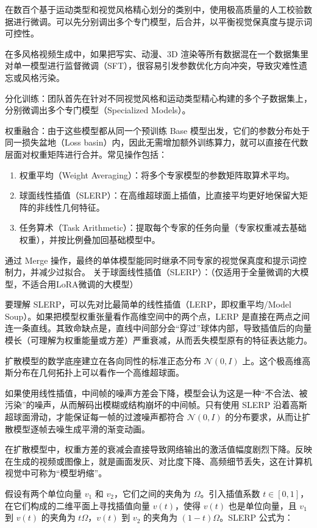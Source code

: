 在数百个基于运动类型和视觉风格精心划分的类别中，使用极高质量的人工校验数据进行微调。可以先分别调出多个专门模型，后合并，以平衡视觉保真度与提示词可控性。

在多风格视频生成中，如果把写实、动漫、3D 渲染等所有数据混在一个数据集里对单一模型进行监督微调（SFT），很容易引发参数优化方向冲突，导致灾难性遗忘或风格污染。

分化训练：团队首先在针对不同视觉风格和运动类型精心构建的多个子数据集上，分别微调出多个专门模型（Specialized Models）。

权重融合：由于这些模型都从同一个预训练 Base 模型出发，它们的参数分布处于同一损失盆地（Loss basin）内，因此无需增加额外训练算力，就可以直接在代数层面对权重矩阵进行合并。常见操作包括：

\begin{enumerate}
\def\labelenumi{\arabic{enumi}.}
\item
  权重平均（Weight Averaging）：将多个专家模型的参数矩阵取算术平均。
\item
  球面线性插值（SLERP）：在高维超球面上插值，比直接平均更好地保留大矩阵的非线性几何特征。
\item
  任务算术（Task Arithmetic）：提取每个专家的任务向量（专家权重减去基础权重），并按比例叠加回基础模型中。
\end{enumerate}

通过 Merge 操作，最终的单体模型能同时继承不同专家的视觉保真度和提示词控制力，并减少过拟合。
关于球面线性插值（SLERP）：（仅适用于全量微调的大模型，不适合用LoRA微调的大模型）

要理解 SLERP，可以先对比最简单的线性插值（LERP，即权重平均/Model Soup）。如果把模型权重张量看作高维空间中的两个点，LERP 是直接在两点之间连一条直线。其致命缺点是，直线中间部分会``穿过''球体内部，导致插值后的向量模长（可理解为权重能量或方差）严重衰减，从而丢失模型原有的特征表达能力。

扩散模型的数学底座建立在各向同性的标准正态分布 \(\mathcal{N}(0,I)\) 上。这个极高维高斯分布在几何拓扑上可以看作一个高维超球面。

如果使用线性插值，中间帧的噪声方差会下降，模型会认为这是一种``不合法、被污染''的噪声，从而解码出模糊或结构崩坏的中间帧。只有使用 SLERP 沿着高斯超球面滑动，才能保证每一帧的过渡噪声都符合 \(\mathcal{N}(0,I)\) 的分布要求，从而让扩散模型逐帧去噪生成平滑的渐变动画。

在扩散模型中，权重方差的衰减会直接导致网络输出的激活值幅度剧烈下降。反映在生成的视频或图像上，就是画面发灰、对比度下降、高频细节丢失，这在计算机视觉中可称为``模型坍缩''。

假设有两个单位向量 \(v_1\) 和 \(v_2\)，它们之间的夹角为 \(\Omega\)。引入插值系数 \(t\in[0,1]\)，在它们构成的二维平面上寻找插值向量 \(v(t)\)，使得 \(v(t)\) 也是单位向量，且 \(v_1\) 到 \(v(t)\) 的夹角为 \(t\Omega\)，\(v(t)\) 到 \(v_2\) 的夹角为 \((1-t)\Omega\)。SLERP 公式为：

